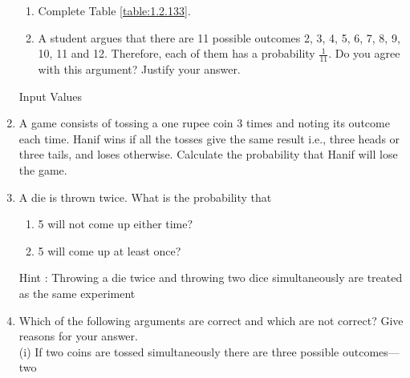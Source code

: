 \begin{enumerate}[label=\arabic*.,ref=\thesubsection.\theenumi]
\begin{enumerate}
\item  Complete Table \ref{table:1.2.133}.
\item  A student argues that there are 11 possible outcomes 2, 3, 4, 5, 6, 7, 8, 9, 10, 11 and 12. Therefore, each of them has a probability $\frac{1}{11}$. Do you agree with this argument? Justify your answer.
\end{enumerate}
%
\begin{table}[ht!]
\centering

\caption{Input Values}
\label{table:1.2.133}	
\end{table}
\solution

\item A game consists of tossing a one rupee coin 3 times and noting its outcome each time. Hanif wins if all the tosses give the same result i.e., three heads or three tails, and loses otherwise. Calculate the probability that Hanif will lose the game.
\\
\solution

\item A die is thrown twice. What is the probability that\\
\begin{enumerate}[label=(\roman*)]
\item  5 will not come up either time? \\
\item  5 will come up at least once?\\
\end{enumerate}
Hint : Throwing a die twice and throwing two dice simultaneously are treated as the
same experiment
\\
\solution

\item Which of the following arguments are correct and which are not correct? Give reasons
for your answer.\\
(i) If two coins are tossed simultaneously there are three possible outcomes—two

\end{enumerate}
